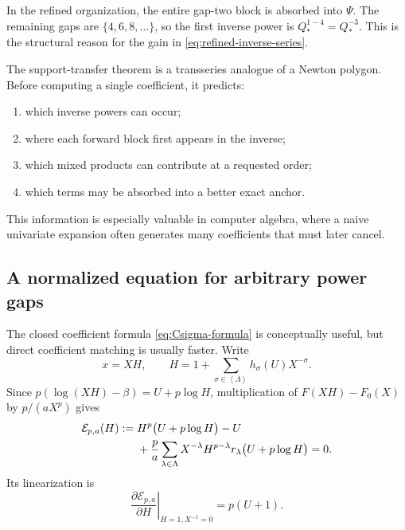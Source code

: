 \documentclass[11pt,oneside]{article}
\theoremstyle{plain}
\theoremstyle{definition}
\theoremstyle{remark}
\newcommand{\calE}{\mathcal{E}}
\newcommand{\angles}[1]{\left\langle #1\right\rangle}
\begin{document}
In the refined organization, the entire gap-two block is absorbed into
\(\Psi\).  The remaining gaps are \(\{4,6,8,\ldots\}\), so the first inverse
power is \(Q_*^{1-4}=Q_*^{-3}\).  This is the structural reason for the gain in
\eqref{eq:refined-inverse-series}.

\begin{methodbox}
The support-transfer theorem is a transseries analogue of a Newton polygon.
Before computing a single coefficient, it predicts:
\begin{enumerate}
\item which inverse powers can occur;
\item where each forward block first appears in the inverse;
\item which mixed products can contribute at a requested order;
\item which terms may be absorbed into a better exact anchor.
\end{enumerate}
This information is especially valuable in computer algebra, where a naive
univariate expansion often generates many coefficients that must later cancel.
\end{methodbox}

\subsection{A normalized equation for arbitrary power gaps}
\label{subsec:general-normalized-equation}

The closed coefficient formula \eqref{eq:Csigma-formula} is conceptually useful,
but direct coefficient matching is usually faster.  Write
\begin{equation}
 x=XH,
 \qquad
 H=1+\sum_{\sigma\in\angles{\Lambda}}h_\sigma(U)X^{-\sigma}.
 \label{eq:general-H}
\end{equation}
Since \(p(\log(XH)-\beta)=U+p\log H\), multiplication of
\(F(XH)-F_0(X)\) by \(p/(aX^p)\) gives
\begin{align}
 \calE_{p,a}(H):={}&H^p\bigl(U+p\log H\bigr)-U
 \notag\\
 &+\frac{p}{a}\sum_{\lambda\in\Lambda}X^{-\lambda}
 H^{p-\lambda}r_\lambda\bigl(U+p\log H\bigr)=0.
 \label{eq:general-normalized-E}
\end{align}
Its linearization is
\begin{equation}
 \left.\frac{\partial\calE_{p,a}}{\partial H}\right|_{H=1,X^{-1}=0}
 =p(U+1).
 \label{eq:general-E-linearization}
\end{equation}
\end{document}
